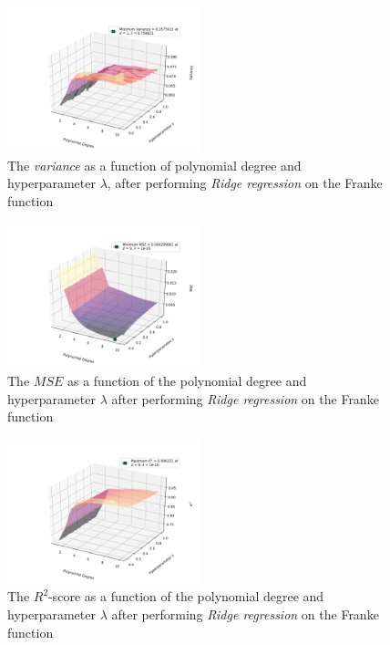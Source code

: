 \documentclass[a4paper,10pt,english]{article}
\begin{document}
\begin{figure}[H]
	\centering 
	\includegraphics[width = 0.5\textwidth, center]{../franke_output/part_D_1.png}
	\caption{The \textit{variance} as a function of polynomial degree and hyperparameter $\lambda$, after performing \textit{Ridge regression} on the Franke function}
	\label{fig_8}
\end{figure}

\begin{figure}[H]
	\centering 
	\includegraphics[width = 0.5\textwidth, center]{../franke_output/part_D_2.png}
	\caption{The $MSE$ as a function of the polynomial degree and hyperparameter $\lambda$ after performing \textit{Ridge regression} on the Franke function}
	\label{fig_9}
\end{figure}

\begin{figure}[H]
	\centering 
	\includegraphics[width = 0.5\textwidth, center]{../franke_output/part_D_3.png}
	\caption{The $R^2$-score as a function of the polynomial degree and hyperparameter $\lambda$ after performing \textit{Ridge regression} on the Franke function}
	\label{fig_10}
\end{figure}
\end{document}
